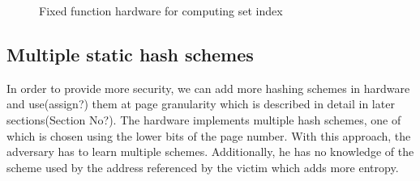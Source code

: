 \begin{figure}
  \caption{Fixed function hardware for computing set index}
  \label{figure:fixed_func_hw}
\end{figure}

\subsection{Multiple static hash schemes}
In order to provide more security, we can add more hashing schemes in hardware and use(assign?) them at page granularity which is described in detail in later sections(Section No?). The hardware implements multiple hash schemes, one of which is chosen using the lower bits of the page number. With this approach, the adversary has to learn multiple schemes. Additionally, he has no knowledge of the scheme used by the address referenced by the victim which adds more entropy.

